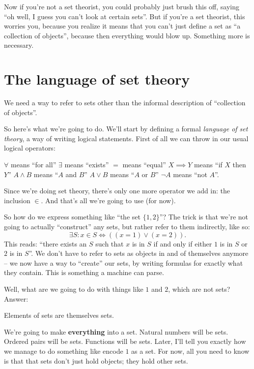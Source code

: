 Now if you're not a set theorist, you could probably just brush this off,
saying ``oh well, I guess you can't look at certain sets''.
But if you're a set theorist, this worries you,
because you realize it means that you can't just define a set as ``a collection of objects'',
because then everything would blow up. Something more is necessary.



\section{The language of set theory}
We need a way to refer to sets other
than the informal description of ``collection of objects''.

So here's what we're going to do.
We'll start by defining a formal \emph{language of set theory},
a way of writing logical statements.
First of all we can throw in our usual logical operators:
\begin{itemize}
	\ii $\forall$ means ``for all''
	\ii $\exists$ means ``exists''
	\ii $=$ means ``equal''
	\ii $X \implies Y$ means ``if $X$ then $Y$''
	\ii $A \land B$ means ``$A$ and $B$''
	\ii $A \lor B$ means ``$A$ or $B$''
	\ii $\neg A$ means ``not $A$''.
\end{itemize}

Since we're doing set theory,
there's only one more operator we add in: the inclusion $\in$.
And that's all we're going to use (for now).

So how do we express something like ``the set $\{1, 2\}$''?
The trick is that we're not going to actually ``construct'' any sets,
but rather refer to them indirectly, like so:
\[ \exists S : x \in S \iff \left( (x=1) \lor (x=2) \right). \]
This reads: ``there exists an $S$ such that $x$ is in $S$ if
and only if either $1$ is in $S$ or $2$ is in $S$''.
We don't have to refer to sets as objects in and of themselves anymore -- we now have a way to ``create'' our sets, by writing formulas for exactly what they contain. This is something a machine can parse.

Well, what are we going to do with things like $1$ and $2$, which are not sets? 
Answer:
\begin{moral}
	Elements of sets are themselves sets.
\end{moral}
We're going to make \textbf{everything} into a set.
Natural numbers will be sets. Ordered pairs will be sets. Functions will be sets. 
Later, I'll tell you exactly how we manage to do something like encode $1$ as a set.
For now, all you need to know is that that sets don't just hold objects;
they hold other sets.

